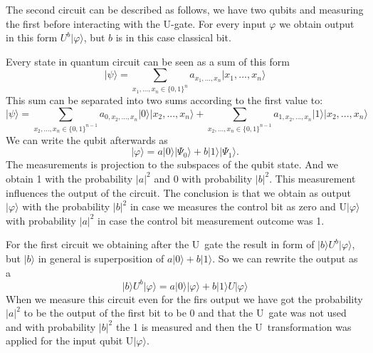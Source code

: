 \documentclass[a4paper,10pt]{article}
\newcommand{\qb}[1]{\ensuremath{\vert{#1}\rangle}}
\newcommand{\meter}{\texttt{[image: meter.eps]}}
\begin{document}
\begin{enumerate}
\begin{figure}[h]
{
  }
  \caption{}
\end{figure}

The second circuit can be described as follows, we have two qubits and measuring the first before interacting with the U-gate. For every input $\varphi$ we obtain output in this form $U^{b}\qb{\varphi}$, but $b$ is in this case classical bit.

Every state in quantum circuit can be seen as a sum of this form
$$
\qb{\psi} = \sum_{x_1,...,x_n \in \lbrace 0,1 \rbrace^n}a_{x_1,...,x_n} \qb{x_1,...,x_n}
$$
This sum can be separated into two sums according to the first value to:
$$
\qb{\psi} = \sum_{x_2,...,x_n \in \lbrace 0,1 \rbrace^{n-1}}a_{0,x_2,...,x_n} \qb{0}\qb{x_2,...,x_n} +  \sum_{x_2,...,x_n \in \lbrace 0,1 \rbrace^{n-1}}a_{1,x_2,...,x_n} \qb{1}\qb{x_2,...,x_n} 
$$
We can write the qubit afterwards as $$\qb{\varphi} = a\qb{0}\qb{\Psi_0} + b\qb{1}\qb{\Psi_1}.$$ The measurements is projection to the subspaces of the qubit state. And we obtain 1 with the probability $|a|^2$ and 0 with probability $|b|^2$.
This measurement influences the output of the circuit. The conclusion is that we obtain as output $\qb{\varphi}$ with the probability $|b|^2$ in case we measures the control bit as zero and U\qb{\varphi} with probability $|a|^2$ in case the control bit measurement outcome was 1.

For the first circuit we obtaining after the U~gate the result in form of $\qb{b}U^b\qb{\varphi}$, but \qb{b} in general is superposition of $a\qb{0} + b\qb{1}$. So we can rewrite the output as a
$$
\qb{b}U^b\qb{\varphi} = a\qb{0}\qb{\varphi} + b\qb{1}U\qb{\varphi}
$$
When we measure this circuit even for the firs output we have got the probability $|a|^2$ to be the output of the first bit to be 0 and that the U~gate was not used and with probability $|b|^2$ the 1 is measured and then the U~transformation was applied for the input qubit U\qb{\varphi}.


\end{enumerate}
\end{document}
